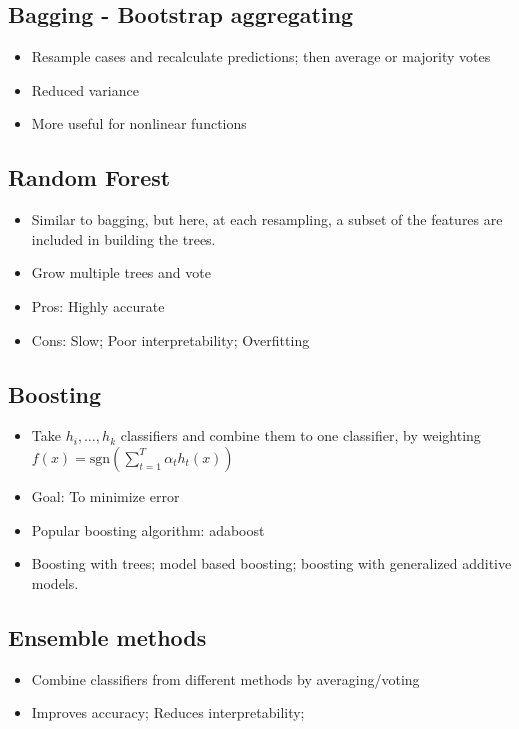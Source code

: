 \documentclass[11pt]{extarticle} %
\begin{document}
\subsection{Bagging - Bootstrap aggregating}
\begin{itemize}
\item Resample cases and recalculate predictions; then average or majority votes
\item Reduced variance
\item More useful for nonlinear functions
\end{itemize}

\subsection{Random Forest}
\begin{itemize}
\item Similar to bagging, but here, at each resampling, a subset of the features are included in building the trees.
\item Grow multiple trees and vote
\item Pros: Highly accurate
\item Cons: Slow; Poor interpretability; Overfitting
\end{itemize}

\subsection{Boosting}
\begin{itemize}
\item Take $h_i,\dots, h_k$ classifiers and combine them to one classifier, by weighting $f(x) = \text{sgn}\left(\sum\limits_{t=1}^T \alpha_t h_t(x) \right)$
\item Goal: To minimize error
\item Popular boosting algorithm: adaboost
\item Boosting with trees; model based boosting; boosting with generalized additive models.
\end{itemize}

\subsection{Ensemble methods}
\begin{itemize}
\item Combine classifiers from different methods by averaging/voting
\item Improves accuracy; Reduces interpretability; 

\end{itemize}
\end{document}
